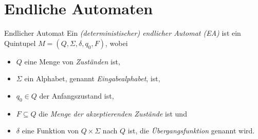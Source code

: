 \documentclass[a4paper,10pt]{article}
\begin{document}
\section{Endliche Automaten}
\begin{mainbox}{Endlicher Automat}
    Ein \emph{(deterministischer) endlicher Automat (EA)} ist ein Quintupel $M = (Q, \Sigma, \delta, q_0, F)$, wobei
    \begin{itemize}
        \item $Q$ eine Menge von \emph{Zuständen} ist,
        \item $\Sigma$ ein Alphabet, genannt \emph{Eingabealphabet}, ist,
        \item $q_0 \in Q$ der Anfangszustand ist,
        \item $F \subseteq Q$ die \emph{Menge der akzeptierenden Zustände} ist und
        \item $\delta$ eine Funktion von $Q \times \Sigma$ nach $Q$ ist, die \emph{Übergangsfunktion} genannt wird.
    \end{itemize}
\end{mainbox}
\end{document}
